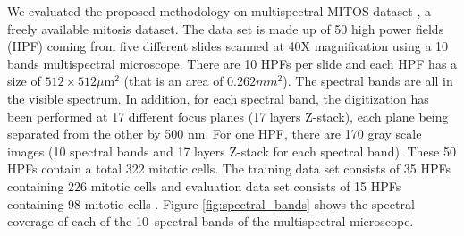 \documentclass[10pt,twocolumn,letterpaper]{article}
\begin{document}
We evaluated the proposed methodology on multispectral MITOS dataset \cite{mITOS2012}, a freely available mitosis dataset. The data set is made up of 50 high power fields (HPF) coming from five different slides scanned at 40X magnification using a 10 bands multispectral microscope. There are 10 HPFs per slide and each HPF has a size of $512\times512\mu\text{m}^2$ (that is an area of $0.262mm^2$). The spectral bands are all in the visible spectrum. In addition, for each spectral band, the digitization has been performed at 17 different focus planes (17 layers Z-stack), each plane being separated from the other by 500 nm. For one HPF, there are 170 gray scale images (10 spectral bands and 17 layers Z-stack for each spectral band). These 50 HPFs contain a total 322 mitotic cells. The training data set consists of 35 HPFs containing 226 mitotic cells and evaluation data set consists of 15 HPFs containing 98 mitotic cells \cite{roux2013}. Figure \ref{fig:spectral_bands} shows the spectral coverage of each of the 10~spectral bands of the multispectral microscope.
\end{document}
